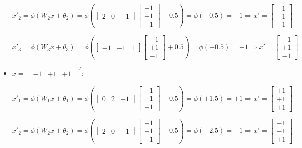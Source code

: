 \documentclass[letterpaper,headings=standardclasses]{scrartcl}
\begin{document}
\begin{itemize}
$$ x'_{2} = \phi(W_2 x + \theta_2) = \phi \left( \left[ \begin{matrix} 2 & 0 & -1 \end{matrix} \right] \left[ \begin{matrix} -1 \\ +1 \\ -1 \end{matrix} \right] + 0.5 \right) = \phi \left( -0.5 \right) = -1 \Rightarrow x' = \left[ \begin{matrix} -1 \\ -1 \\ -1 \end{matrix} \right] $$

$$ x'_{3} = \phi(W_3 x + \theta_3) = \phi \left( \left[ \begin{matrix} -1 & -1 & 1 \end{matrix} \right] \left[ \begin{matrix} -1 \\ +1 \\ -1 \end{matrix} \right] + 0.5 \right) = \phi \left( -0.5 \right) = -1 \Rightarrow x' = \left[ \begin{matrix} -1 \\ +1 \\ -1 \end{matrix} \right] $$

\item $x = [\begin{matrix} -1 & +1 & +1 \end{matrix}]^T$:

$$ x'_{1} = \phi(W_1 x + \theta_1) = \phi \left( \left[ \begin{matrix} 0 & 2 & -1 \end{matrix} \right] \left[ \begin{matrix} -1 \\ +1 \\ +1 \end{matrix} \right] + 0.5 \right) = \phi \left( +1.5 \right) = +1 \Rightarrow x' = \left[ \begin{matrix} +1 \\ +1 \\ +1 \end{matrix} \right] $$

$$ x'_{2} = \phi(W_2 x + \theta_2) = \phi \left( \left[ \begin{matrix} 2 & 0 & -1 \end{matrix} \right] \left[ \begin{matrix} -1 \\ +1 \\ +1 \end{matrix} \right] + 0.5 \right) = \phi \left( -2.5 \right) = -1 \Rightarrow x' = \left[ \begin{matrix} -1 \\ -1 \\ +1 \end{matrix} \right] $$


\end{itemize}
\end{document}
